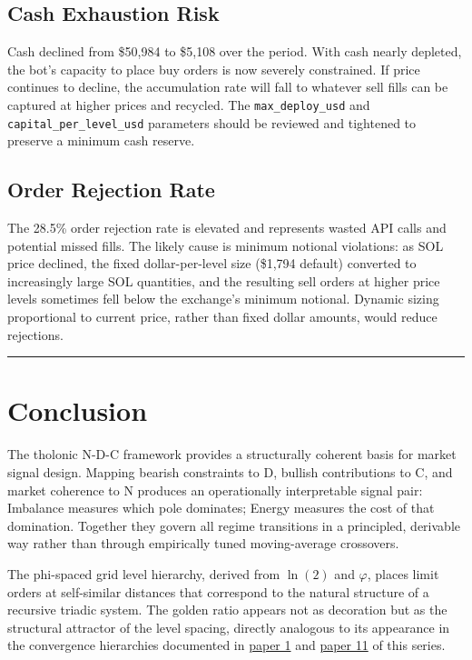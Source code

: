 \documentclass[12pt]{article}
\begin{document}
\subsection{Cash Exhaustion Risk}\label{cash-exhaustion-risk}

Cash declined from \$50,984 to \$5,108 over the period. With cash nearly
depleted, the bot's capacity to place buy orders is now severely
constrained. If price continues to decline, the accumulation rate will
fall to whatever sell fills can be captured at higher prices and
recycled. The \texttt{max\_deploy\_usd} and
\texttt{capital\_per\_level\_usd} parameters should be reviewed and
tightened to preserve a minimum cash reserve.

\subsection{Order Rejection Rate}\label{order-rejection-rate}

The 28.5\% order rejection rate is elevated and represents wasted API
calls and potential missed fills. The likely cause is minimum notional
violations: as SOL price declined, the fixed dollar-per-level size
(\$1,794 default) converted to increasingly large SOL quantities, and
the resulting sell orders at higher price levels sometimes fell below
the exchange's minimum notional. Dynamic sizing proportional to current
price, rather than fixed dollar amounts, would reduce rejections.

\begin{center}\rule{0.5\linewidth}{0.5pt}\end{center}

\section{Conclusion}\label{conclusion}

The tholonic N-D-C framework provides a structurally coherent basis for
market signal design. Mapping bearish constraints to D, bullish
contributions to C, and market coherence to N produces an operationally
interpretable signal pair: Imbalance measures which pole dominates;
Energy measures the cost of that domination. Together they govern all
regime transitions in a principled, derivable way rather than through
empirically tuned moving-average crossovers.

The phi-spaced grid level hierarchy, derived from \(\ln(2)\) and
\(\varphi\), places limit orders at self-similar distances that
correspond to the natural structure of a recursive triadic system. The
golden ratio appears not as decoration but as the structural attractor
of the level spacing, directly analogous to its appearance in the
convergence hierarchies documented in
\href{https://github.com/baardev/truevalue/blob/main/docnav/Research/papers/1_recursive-tholonic-five-constants/1_recursive-tholonic-five-constants.pdf}{paper
1} and
\href{https://github.com/baardev/truevalue/blob/main/docnav/Research/papers/11_tholonic-seed-space-power-of-two-hierarchy/11_tholonic-seed-space-power-of-two-hierarchy.pdf}{paper
11} of this series.
\end{document}
